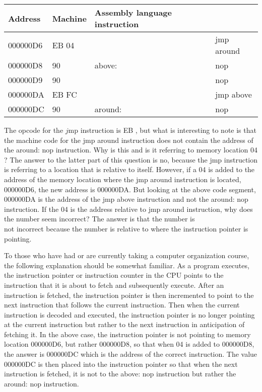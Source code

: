 \documentclass[10pt]{article}
\begin{document}
\begin{center}
\begin{tabular}{|l|l|l|l|}
\hline
Address & Machine & Assembly language instruction &  \\
\hline
000000D6 & EB 04 &  & jmp around \\
\hline
000000D8 & 90 & above: & nop \\
\hline
000000D9 & 90 &  & nop \\
\hline
000000DA & EB FC &  & jmp above \\
\hline
000000DC & 90 & around: & nop \\
\hline
\end{tabular}
\end{center}

The opcode for the $j \mathrm{mp}$ instruction is EB , but what is interesting to note is that the machine code for the jmp around instruction does not contain the address of the around: nop instruction. Why is this and is it referring to memory location 04 ? The answer to the latter part of this question is no, because the jmp instruction is referring to a location that is relative to itself. However, if a 04 is added to the address of the memory location where the jmp around instruction is located, 000000D6, the new address is 000000DA. But looking at the above code segment, 000000DA is the address of the jmp above instruction and not the around: nop instruction. If the 04 is the address relative to jmp around instruction, why does the number seem incorrect? The answer is that the number is\\
not incorrect because the number is relative to where the instruction pointer is pointing.

To those who have had or are currently taking a computer organization course, the following explanation should be somewhat familiar. As a program executes, the instruction pointer or instruction counter in the CPU points to the instruction that it is about to fetch and subsequently execute. After an instruction is fetched, the instruction pointer is then incremented to point to the next instruction that follows the current instruction. Then when the current instruction is decoded and executed, the instruction pointer is no longer pointing at the current instruction but rather to the next instruction in anticipation of fetching it. In the above case, the instruction pointer is not pointing to memory location 000000D6, but rather 000000D8, so that when 04 is added to 000000D8, the answer is 000000DC which is the address of the correct instruction. The value 000000DC is then placed into the instruction pointer so that when the next instruction is fetched, it is not to the above: nop instruction but rather the around: nop instruction.
\end{document}
